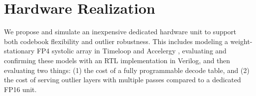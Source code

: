 




\section{Hardware Realization}\label{sec:Proposed}

We propose and simulate an inexpensive dedicated hardware unit to support both
codebook flexibility and outlier robustness. This includes modeling a
weight-stationary FP4 systolic array in Timeloop and Accelergy
\cite{parashar2019timeloop,wu2019accelergy}, evaluating and confirming these
models with an RTL implementation in Verilog, and then evaluating two things:
(1) the cost of a fully programmable decode table, and (2) the cost of serving
outlier layers with multiple passes compared to a dedicated FP16 unit.


